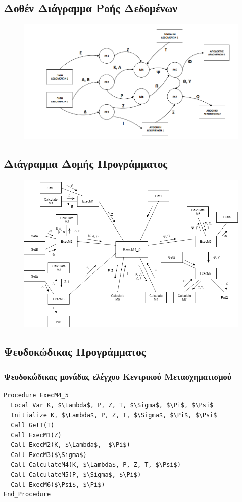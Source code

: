 \documentclass{article}
\begin{document}
\subsection*{Δοθέν Διάγραμμα Ροής Δεδομένων}
\begin{figure}[!h]
	\includegraphics[width=\linewidth]{../Structured_Design/drd.png}
\end{figure}

\subsection{Διάγραμμα Δομής Προγράμματος}
\begin{figure}[!h]
	\includegraphics[width=14cm]{../Structured_Design/ddp.png}
\end{figure}

\newpage
\subsection{Ψευδοκώδικας Προγράμματος}
\subsubsection{Ψευδοκώδικας μονάδας ελέγχου Κεντρικού Μετασχηματισμού}
\begin{lstlisting}[mathescape]
Procedure ExecM4_5
  Local Var K, $\Lambda$, P, Z, T, $\Sigma$, $\Pi$, $\Psi$
  Initialize K, $\Lambda$, P, Z, T, $\Sigma$, $\Pi$, $\Psi$
  Call GetT(T)
  Call ExecM1(Z)
  Call ExecM2(K, $\Lambda$,  $\Pi$)
  Call ExecM3($\Sigma$)
  Call CalculateM4(K, $\Lambda$, P, Z, T, $\Psi$)
  Call CalculateM5(P, $\Sigma$, $\Pi$)
  Call ExecM6($\Psi$, $\Pi$)
End_Procedure
\end{lstlisting}
\end{document}
